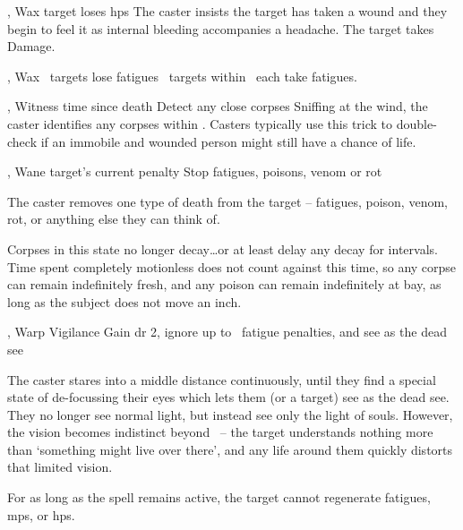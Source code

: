   {\mFate, \mAir}%
  {Wax}%
  {\detailed}%
  {}%
  {target loses  \glspl{hp}}%
  {
    The caster insists the target has taken a wound and they begin to feel it as internal bleeding accompanies a headache.
    The target takes  Damage.
  }

  {\mFate, \mAir}%
  {Wax}%
  {\duplicated}%
  {}%
  {\spellArea\ targets lose  \glspl{fatigue}}%
  {
    \spellArea\ targets within \spellRange\ each take  \glspl{fatigue}.
  }

  {\mFate, \mAir}%
  {Witness}%
  {\distant}%
  {time since death}%
  {Detect any close corpses}%
  {
    Sniffing at the wind, the caster identifies any corpses within \spellRange.
    Casters typically use this trick to double-check if an immobile and wounded person might still have a chance of life.
  }

  {\mFate, \mAir}%
  {Wane}%
  {\detailed}%
  {target's current  penalty}%
  {Stop \glspl{fatigue}, poisons, venom or rot}%
  {
    The caster removes one type of death from the target -- \glspl{fatigue}, poison, venom, rot, or anything else they can think of.

    Corpses in this state no longer decay\ldots or at least delay any decay for  \glspl{interval}. 
    Time spent completely motionless does not count against this time, so any corpse can remain indefinitely fresh, and any poison can remain indefinitely at bay, as long as the subject does not move an inch.
  }

  {\mFate, \mAir}%
  {Warp}%
  {\detailed}%
  {Vigilance}%
  {Gain \gls{dr} 2, ignore up to ~\gls{fatigue} penalties, and see as the dead see}%
  {
    The caster stares into a middle distance continuously, until they find a special state of de-focussing their eyes which lets them (or a target) see as the dead see.
    They no longer see normal light, but instead see only the light of souls.
    However, the vision becomes indistinct beyond \spellRange\ -- the target understands nothing more than `something might live over there', and any life around them quickly distorts that limited vision.

    For as long as the spell remains active, the target cannot regenerate \glspl{fatigue}, \glspl{mp}, or \glspl{hp}.
  }

